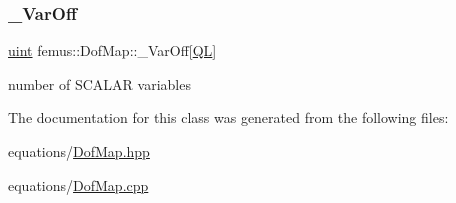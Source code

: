 \mbox{\label{classfemus_1_1_dof_map_a45b5e2e1aca510da954ff2f96d95f42c}} 
\subsubsection{\texorpdfstring{\+\_\+\+Var\+Off}{\_VarOff}}
{\footnotesize\ttfamily \mbox{\hyperlink{_typedefs_8hpp_a91ad9478d81a7aaf2593e8d9c3d06a14}{uint}} femus\+::\+Dof\+Map\+::\+\_\+\+Var\+Off\mbox{[}\mbox{\hyperlink{_f_e_type_enum_8hpp_aca285339f9cf24489fdc0af5b51a5fde}{QL}}\mbox{]}}



number of S\+C\+A\+L\+AR variables 



The documentation for this class was generated from the following files\+:\begin{DoxyCompactItemize}
\item 
equations/\mbox{\hyperlink{_dof_map_8hpp}{Dof\+Map.\+hpp}}\item 
equations/\mbox{\hyperlink{_dof_map_8cpp}{Dof\+Map.\+cpp}}\end{DoxyCompactItemize}
